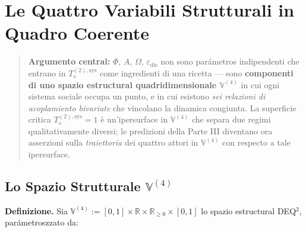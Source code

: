 \chapter{Le Quattro Variabili Strutturali in Quadro
Coerente}\label{le-quattro-variables-strutturali-in-quadro-coerente}

\begin{quote}
\textbf{Argumento central:} \(\Phi\), \(A\), \(\Omega\),
\(\varepsilon_{\text{dis}}\) non sono parámetros indipendenti che entrano
in \(T_s^{(2),\text{sys}}\) come ingredienti di una ricetta --- sono
\textbf{componenti di uno spazio estructural quadridimensionale
\(\mathbb{V}^{(4)}\)} in cui ogni sistema sociale occupa un punto, e in
cui esistono \emph{sei relazioni di acoplamiento bivariate} che
vincolano la dinamica congiunta. La superficie critica
\(T_s^{(2),\text{sys}} = 1\) è un'ipersurface in \(\mathbb{V}^{(4)}\)
che separa due regimi qualitativamente diversi; le predizioni della
Parte III diventano ora asserzioni sulla \emph{traiettoria} dei quattro
attori in \(\mathbb{V}^{(4)}\) con respecto a tale ipersurface.
\end{quote}



\section{\texorpdfstring{Lo Spazio Strutturale
\(\mathbb{V}^{(4)}\)}{Lo Spazio Strutturale \textbackslash mathbb\{V\}\^{}\{(4)\}}}\label{lo-spazio-estructural-mathbbv4}

\Hypoth{} \textbf{Definizione.} Sia
\(\mathbb{V}^{(4)} := [0, 1] \times \mathbb{R} \times \mathbb{R}_{\geq 0} \times [0, 1]\)
lo spazio estructural DEQ$^2$, parámetroszzato da:

